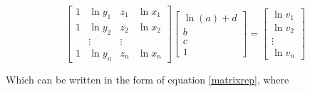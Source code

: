 \documentclass[12pt,a4paper]{article}
\begin{document}
\begin{equation}
\left[\begin{array}{cccc} {1} & {\ln y_1} & {z_1} & {\ln x_1} \\  {1} & {\ln y_2} & {z_2} & {\ln x_2} \\ & \vdots & \vdots & \\  {1} & {\ln y_n} & {z_n} & {\ln x_n}\end{array} \right]
\left[\begin{array}{c}{\ln(a) + d}\\ {b} \\ {c}\\ {1} \end{array}\right] = \left[ \begin{array}{c}\ln v_1 \\ \ln v_2 \\ \vdots \\ \ln v_n \end{array}\right]
\end{equation}

\noindent Which can be written in the form of equation \ref{matrixrep}, where 
\end{document}
